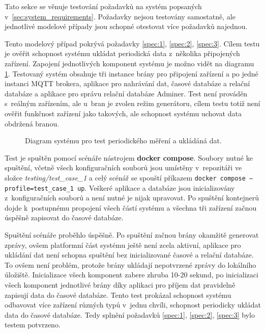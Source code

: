 Tato sekce se věnuje testování požadavků na systém popsaných v~\ref{sec:system_requirements}. Požadavky nejsou testovány samostatně, ale jednotlivé modelové případy jsou schopné otestovat více požadavků najednou.

Tento modelový případ pokrývá požadavky \ref{spec:1}, \ref{spec:2}, \ref{spec:3}. Cílem testu je ověřit schopnost systému ukládat periodická data z~několika připojených zařízení. Zapojení jednotlivých komponent systému je možno vidět na diagramu \ref{pic:test_1_setup}. 
Testovaný systém obsahuje tři instance brány pro připojení zařízení a po jedné instanci MQTT brokera, aplikace pro nahrávání dat, časové databáze a relační databáze a aplikace pro správu relační databáze Adminer. Test není prováděn s~reálným zařízením, ale u~bran je zvolen režim generátoru, cílem testu totiž není ověřit funkčnost zařízení jako takových, ale schopnost systému uchovat data obdržená branou.

\begin{figure}[h]
  \centering
  
  \caption{Diagram systému pro test periodického měření a ukládáná dat.}
  \label{pic:test_1_setup}
\end{figure}

Test je spuštěn pomocí scénáře nástrojem \textbf{docker compose}. Soubory nutné ke spuštění, včetně všech konfiguračních souborů jsou umístěny v~repozitáři ve složce \textit{testing/test\_case\_1} a celý scénář se spouští příkazem \texttt{docker compose --profile=test\_case\_1 up}. Veškeré aplikace a databáze jsou inicializovány z~konfiguračních souborů a není nutné je nijak upravovat. Po spuštění kontejnerů dojde k~postupnému propojení všech částí systému a všechna tři zařízení začnou úspěšně zapisovat do časové databáze.

Spuštění scénáře proběhlo úspěšně. Po spuštění začnou brány okamžitě generovat zprávy, ovšem platformní část systému ještě není zcela aktivní, aplikace pro ukládání dat není schopna spuštění bez inicializované časové a relační databáze. To ovšem není problém, protože brány ukládají nepotvrzené zprávy do lokálního úložiště. Inicializace všech komponent zabere zhruba 10-20 sekund, po inicializaci všech komponent jednotlivé brány díky aplikaci pro příjem dat pravidelně zapisují data do časové databáze. Tento test prokázal schopnost systému odbavovat více zařízení různých typů v~jednu chvíli, schopnost periodicky ukládat data do časové databáze. Tedy splnění požadavků \ref{spec:1}, \ref{spec:2}, \ref{spec:3} bylo testem potvrzeno.

